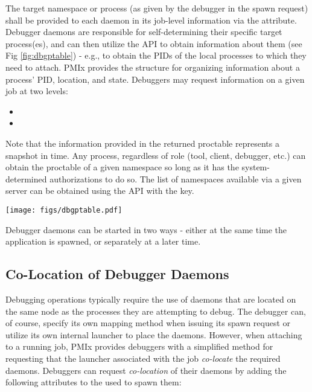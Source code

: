 The target namespace or process (as given by the debugger in the spawn request) shall be provided to each daemon in its job-level information via the  attribute. Debugger daemons are responsible for self-determining their specific target process(es), and can then utilize the  \ac{API} to obtain information about them (see Fig \ref{fig:dbgptable}) - e.g., to obtain the \acp{PID} of the local processes to which they need to attach. \ac{PMIx} provides the  structure for organizing information about a process' \ac{PID}, location, and state. Debuggers may request information on a given job at two levels:

\begin{itemize}
    \item {}
    \item {}
\end{itemize}

Note that the information provided in the returned proctable represents a snapshot in time. Any process, regardless of role (tool, client, debugger, etc.) can obtain the proctable of a given namespace so long as it has the system-determined authorizations to do so. The list of namespaces available via a given server can be obtained using the  \ac{API} with the  key.

\begingroup
\begin{figure*}[ht!]
  \begin{center}
    \texttt{[image: figs/dbgptable.pdf]}
  \end{center}
  \caption{Obtaining proctables}
  \label{fig:dbgptable}
\end{figure*}
\endgroup

Debugger daemons can be started in two ways - either at the same time the application is spawned, or separately at a later time.

\subsection{Co-Location of Debugger Daemons}
\label{chap:api_tools:colocate}

Debugging operations typically require the use of daemons that are located on
the same node as the processes they are attempting to debug. The debugger can,
of course, specify its own mapping method when issuing its spawn request or
utilize its own internal launcher to place the daemons. However, when attaching
to a running job, \ac{PMIx} provides debuggers with a simplified method for
requesting that the launcher associated with the job \emph{co-locate} the
required daemons. Debuggers can request \emph{co-location} of their daemons by
adding the following attributes to the  used to spawn them:

